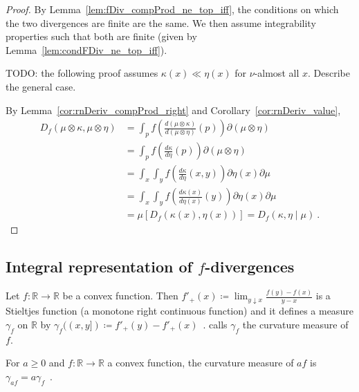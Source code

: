 \begin{proof} \leanok
{}
By Lemma~\ref{lem:fDiv_compProd_ne_top_iff}, the conditions on which the two divergences are finite are the same. We then assume integrability properties such that both are finite (given by Lemma~\ref{lem:condFDiv_ne_top_iff}).

TODO: the following proof assumes $\kappa(x) \ll \eta(x)$ for $\nu$-almost all $x$. Describe the general case.

By Lemma~\ref{cor:rnDeriv_compProd_right} and Corollary~\ref{cor:rnDeriv_value},
\begin{align*}
D_f(\mu \otimes \kappa, \mu \otimes \eta)
&= \int_{p} f\left(\frac{d (\mu \otimes \kappa)}{d (\mu \otimes \eta)}(p)\right) \partial(\mu \otimes \eta)
\\
&= \int_{p} f\left(\frac{d \kappa}{d \eta}(p)\right) \partial(\mu \otimes \eta)
\\
&= \int_x \int_y f\left(\frac{d \kappa}{d \eta}(x, y)\right) \partial \eta(x) \partial \mu
\\
&= \int_x \int_y f\left(\frac{d \kappa(x)}{d \eta(x)}(y)\right) \partial \eta(x) \partial \mu
\\
&= \mu\left[D_f(\kappa(x), \eta(x))\right]
= D_f(\kappa, \eta \mid \mu)
\: .
\end{align*}
\end{proof}



\subsection{Integral representation of $f$-divergences}


\begin{definition}
  \label{def:curvatureMeasure}
  \uses{}
  Let $f: \mathbb{R} \to \mathbb{R}$ be a convex function. Then $f'_+(x) \coloneqq \lim_{y \downarrow x}\frac{f(y) - f(x)}{y - x}$ is a Stieltjes function (a monotone right continuous function) and it defines a measure $\gamma_f$ on $\mathbb{R}$ by $\gamma_f((x,y]) \coloneqq f'_+(y) - f'_+(x)$~. \cite{liese2012phi} calls $\gamma_f$ the curvature measure of $f$.
\end{definition}

\begin{lemma}
  \label{lem:curvatureMeasure_mul}
  For $a \ge 0$ and $f: \mathbb{R} \to \mathbb{R}$ a convex function, the curvature measure of $af$ is $\gamma_{af} = a \gamma_f$~.
\end{lemma}

